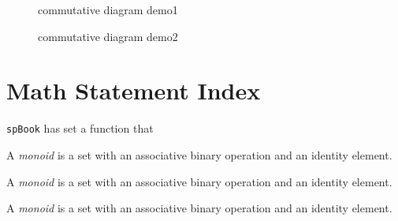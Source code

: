         \begin{figure}[H]
            \centering
            \caption{commutative diagram demo1}
        \end{figure}
        \begin{figure}[H]
            \caption{commutative diagram demo2}
        \end{figure}

    \section{Math Statement Index}
        \texttt{spBook} has set a function that 
        \begin{definition}[]
            A \emph{monoid} is a set with an associative binary operation and an identity element.
        \end{definition}
        \begin{lemma}
            A \emph{monoid} is a set with an associative binary operation and an identity element.
        \end{lemma}
        \begin{theorem}
            A \emph{monoid} is a set with an associative binary operation and an identity element.
        \end{theorem}